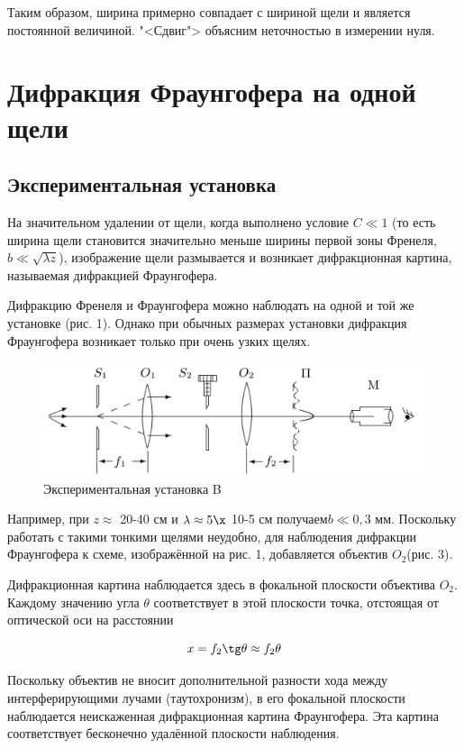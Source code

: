 \documentclass[12pt]{kiarticle}
\begin{document}
Таким образом, ширина примерно совпадает с шириной щели и является постоянной величиной. "<Сдвиг"> объясним неточностью в измерении нуля.  

\section{Дифракция Фраунгофера на одной щели}

	\subsection{Экспериментальная установка}
	
	На значительном удалении от щели, когда выполнено условие $ C \ll 1 $
(то есть ширина щели становится значительно меньше ширины первой
зоны Френеля, $ b \ll \sqrt{\lambda z} $), изображение щели размывается и возникает
дифракционная картина, называемая дифракцией Фраунгофера.

Дифракцию Френеля и Фраунгофера можно наблюдать на одной
и той же установке (рис. 1). Однако при обычных размерах установки дифракция Фраунгофера возникает только при очень узких щелях.

	\begin{figure}[h!]
		\centering
		\includegraphics[width=0.8\linewidth]{b.png}
		\caption{Экспериментальная установка B}
		\label{labB}
	\end{figure}

Например, при $ z \approx $ 20-40 см и $  \lambda \approx 5 \x $ 10-5  см получаем$  b \ll 0,3 $ мм. Поскольку работать с такими тонкими щелями неудобно, для наблюдения дифракции Фраунгофера к схеме, изображённой на рис. 1, добавляется объектив $ O_2  $(рис. 3).

Дифракционная картина наблюдается здесь в фокальной плоскости
объектива $ O_2 $. Каждому значению угла $ \theta $ соответствует в этой плоскости точка, отстоящая от оптической оси на расстоянии

\begin{equation}\label{x}
x = f_2 \tg \theta \approx f_2 \theta
\end{equation}

Поскольку объектив не вносит дополнительной разности хода
между интерферирующими лучами (таутохронизм), в его фокальной
плоскости наблюдается неискаженная дифракционная картина Фраунгофера. Эта картина соответствует бесконечно удалённой плоскости
наблюдения.
\end{document}
